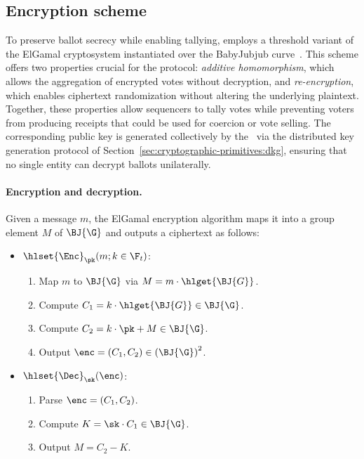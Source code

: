 \subsection{Encryption scheme}
\label{sec:cryptographic-primitives:encryption}

To preserve ballot secrecy while enabling tallying, \davinci employs a threshold variant of the ElGamal cryptosystem instantiated over the BabyJubjub curve~\cite{sutikno1998implementation}. This scheme offers two properties crucial for the protocol: \emph{additive homomorphism}, which allows the aggregation of encrypted votes without decryption, and \emph{re-encryption}, which enables ciphertext randomization without altering the underlying plaintext. Together, these properties allow sequencers to tally votes while preventing voters from producing receipts that could be used for coercion or vote selling. The corresponding public key is generated collectively by the \keywardens\ via the distributed key generation protocol of Section~\ref{sec:cryptographic-primitives:dkg}, ensuring that no single entity can decrypt ballots unilaterally.

\paragraph{Encryption and decryption.}
Given a message $m$, the ElGamal encryption algorithm maps it into a group element $M$ of $\BJ{\G}$ and outputs a ciphertext as follows:
%
\begin{mdframed}
	\begin{minipage}[t]{0.54\textwidth}
		\begin{itemize}
			\item[$\bullet$] $\hlset{\Enc}_{\pk}(m; k \in \F_t)$:
			\begin{enumerate}
				\item Map $m$ to $\BJ{\G}$ via $M = m \cdot \hlget{\BJ{G}}$.
				\item Compute $C_1 = k \cdot \hlget{\BJ{G}} \in \BJ{\G}$.
				\item Compute $C_2 = k \cdot \pk + M \in \BJ{\G}$.
				\item Output $\enc = (C_1, C_2) \in {(\BJ{\G})}^2$.
			\end{enumerate}
		\end{itemize}
	\end{minipage}
	\begin{minipage}[t]{0.44\textwidth}
		\begin{itemize}
			\item[$\bullet$] $\hlset{\Dec}_{\sk}(\enc)$:
			\begin{enumerate}
				\item Parse $\enc = (C_1, C_2)$.
				\item Compute $K = \sk \cdot C_1 \in \BJ{\G}$.
				\item Output $M = C_2 - K$.
			\end{enumerate}
		\end{itemize}
	\end{minipage}
\end{mdframed}

